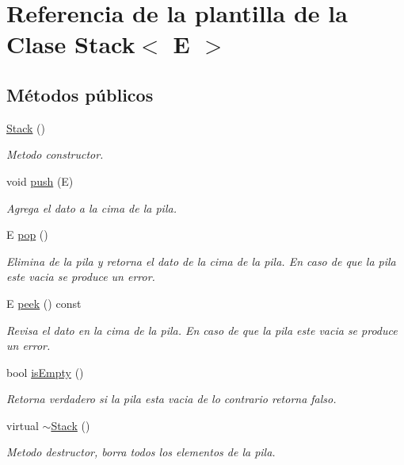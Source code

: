 \hypertarget{classStack}{\section{Referencia de la plantilla de la Clase Stack$<$ E $>$}
\label{classStack}
}
\subsection*{Métodos públicos}
\begin{DoxyCompactItemize}
\item 
\hypertarget{classStack_a561be1726ac9649a9ee3f80a4ca8e4b5}{\hyperlink{classStack_a561be1726ac9649a9ee3f80a4ca8e4b5}{Stack} ()}\label{classStack_a561be1726ac9649a9ee3f80a4ca8e4b5}

\begin{DoxyCompactList}\small\item\em Metodo constructor. \end{DoxyCompactList}\item 
void \hyperlink{classStack_af71e3e142fba5bb861b66b4882289b31}{push} (E)
\begin{DoxyCompactList}\small\item\em Agrega el dato a la cima de la pila. \end{DoxyCompactList}\item 
E \hyperlink{classStack_a5ba7a4c8eec39757e28f95da49f06d52}{pop} ()
\begin{DoxyCompactList}\small\item\em Elimina de la pila y retorna el dato de la cima de la pila. En caso de que la pila este vacia se produce un error. \end{DoxyCompactList}\item 
E \hyperlink{classStack_a19a17240bf7045cf6a3a9497e1091433}{peek} () const 
\begin{DoxyCompactList}\small\item\em Revisa el dato en la cima de la pila. En caso de que la pila este vacia se produce un error. \end{DoxyCompactList}\item 
bool \hyperlink{classStack_a0ce2804f35c0c8cfb999535f35fa438b}{is\-Empty} ()
\begin{DoxyCompactList}\small\item\em Retorna verdadero si la pila esta vacia de lo contrario retorna falso. \end{DoxyCompactList}\item 
\hypertarget{classStack_ad08e4c32f07b8d967913f8b1a45f8620}{virtual \hyperlink{classStack_ad08e4c32f07b8d967913f8b1a45f8620}{$\sim$\-Stack} ()}\label{classStack_ad08e4c32f07b8d967913f8b1a45f8620}

\begin{DoxyCompactList}\small\item\em Metodo destructor, borra todos los elementos de la pila. \end{DoxyCompactList}\end{DoxyCompactItemize}


